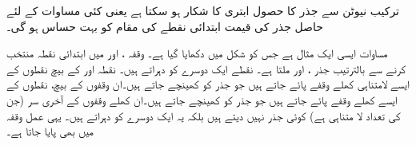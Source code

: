 ترکیب نیوٹن سے جذر کا حصول ابتری کا شکار ہو سکتا ہے یعنی کئی مساوات کے لئے حاصل جذر کی قیمت ابتدائی نقطے کی مقام  کو بہت حساس ہو گی۔

مساوات  ایسی ایک مثال ہے جس کو شکل  میں دکھایا گیا ہے۔ وقفہ
 ،  اور  میں ابتدائی نقطہ منتخب کرنے سے بالترتیب جذر ،  اور  ملتا ہے۔ نقطے 
  ایک دوسرے کو دہراتے ہیں۔ نقطہ  اور  کے بیچ نقطوں کے ایسے لامتناہی کھلے وقفے پائے جاتے ہیں جو جذر  کو کھینچے جاتے ہیں۔ان وقفوں کے بیچ، نقطوں کے ایسے کھلے وقفے پائے جاتے ہیں جو جذر  کو کھینچے جاتے ہیں۔ان کھلے وقفوں کے آخری سر (جن کی تعداد لا متناہی ہے) کوئی جذر نہیں دیتے ہیں بلکہ یہ ایک دوسرے کو دہراتے ہیں۔ یہی عمل وقفہ  میں بھی پایا جاتا ہے۔
 
